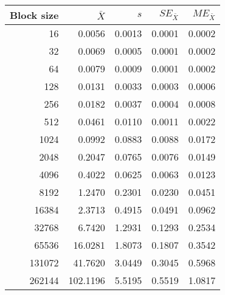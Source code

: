 \begin{tabular}{rrrrr}\toprule
{\small Block size} & $\bar{X}$ & $s$ & $SE_{\bar{X}}$ & $ME_{\bar{X}}$ \\\midrule
16 & 0.0056 & 0.0013 & 0.0001 & 0.0002\\
32 & 0.0069 & 0.0005 & 0.0001 & 0.0002\\
64 & 0.0079 & 0.0009 & 0.0001 & 0.0002\\
128 & 0.0131 & 0.0033 & 0.0003 & 0.0006\\
256 & 0.0182 & 0.0037 & 0.0004 & 0.0008\\
512 & 0.0461 & 0.0110 & 0.0011 & 0.0022\\
1024 & 0.0992 & 0.0883 & 0.0088 & 0.0172\\
2048 & 0.2047 & 0.0765 & 0.0076 & 0.0149\\
4096 & 0.4022 & 0.0625 & 0.0063 & 0.0123\\
8192 & 1.2470 & 0.2301 & 0.0230 & 0.0451\\
16384 & 2.3713 & 0.4915 & 0.0491 & 0.0962\\
32768 & 6.7420 & 1.2931 & 0.1293 & 0.2534\\
65536 & 16.0281 & 1.8073 & 0.1807 & 0.3542\\
131072 & 41.7620 & 3.0449 & 0.3045 & 0.5968\\
262144 & 102.1196 & 5.5195 & 0.5519 & 1.0817\\
\bottomrule
\end{tabular}
